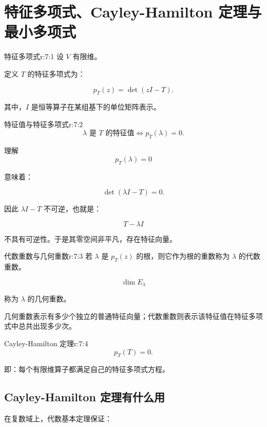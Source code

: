 
\chapter{特征多项式、Cayley-Hamilton 定理与最小多项式}


\begin{jdefn}{特征多项式}{r:7:1}
设 $V$ 有限维。

定义 $T$ 的特征多项式为：

\[
p_T(z)=\det(zI-T).
\]

其中，$I$ 是恒等算子在某组基下的单位矩阵表示。
\end{jdefn}

\begin{jprop}{特征值与特征多项式}{r:7:2}
\[
\lambda\text{ 是 }T\text{ 的特征值}
\iff
p_T(\lambda)=0.
\]
\end{jprop}

\begin{jidea}{理解}
\[
p_T(\lambda)=0
\]

意味着：

\[
\det(\lambda I-T)=0.
\]

因此 $\lambda I-T$ 不可逆，也就是：

\[
T-\lambda I
\]

不具有可逆性。于是其零空间非平凡，存在特征向量。
\end{jidea}

\begin{jdefn}{代数重数与几何重数}{r:7:3}
若 $\lambda$ 是 $p_T(z)$ 的根，则它作为根的重数称为 $\lambda$ 的代数重数。

\[
\dim E_\lambda
\]

称为 $\lambda$ 的几何重数。

几何重数表示有多少个独立的普通特征向量；代数重数则表示该特征值在特征多项式中总共出现多少次。
\end{jdefn}

\begin{jthm}{Cayley-Hamilton 定理}{r:7:4}
\[
p_T(T)=0.
\]

即：每个有限维算子都满足自己的特征多项式方程。
\end{jthm}

\section{Cayley-Hamilton 定理有什么用}

在复数域上，代数基本定理保证：

